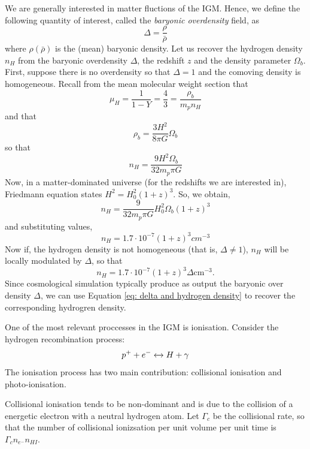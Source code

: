 We are generally interested in matter fluctions of the IGM. Hence, we define the following quantity of interest, called the \emph{baryonic overdensity} field, as 
\begin{equation}
    \Delta =\frac{\rho}{\bar{\rho}}
\end{equation}
where $\rho(\bar{\rho})$ is the (mean) baryonic density. Let us recover the hydrogen density $n_H$ from the baryonic overdensity $\Delta$, the redshift $z$ and the density parameter $\Omega_b$.
First, suppose there is no overdensity so that $\Delta=1$ and the comoving density is homogeneous. Recall from the mean molecular weight section that
\begin{equation}
    \mu_H=\frac{1}{1-Y}=\frac{4}{3}=\frac{\rho_b}{m_pn_H}
\end{equation}
and that
\begin{equation}
    \rho_b=\frac{3H^2}{8\pi G}\Omega_b
\end{equation}
so that
\begin{equation}
    n_H=\frac{9H^2 \Omega_b}{32m_p\pi G} 
\end{equation}
Now, in a matter-dominated universe (for the redshifts we are interested in), Friedmann equation states $H^2=H_0^2(1+z)^3$.
So, we obtain,
\begin{equation}
    n_H=\frac{9}{32m_p\pi G}H_0^2\Omega_b (1+z)^3
\end{equation}
and substituting values,
\begin{equation}
    n_H=1.7\cdot 10^{-7}(1+z)^3 cm^{-3}
\end{equation}
Now if, the hydrogen density is not homogeneous (that is, $\Delta \neq 1$), $n_H$ will be locally modulated by $\Delta$, so that
\begin{equation}\label{eq: delta and hydrogen density}
    n_H=1.7\cdot 10^{-7}(1+z)^3 \Delta \mathrm{cm}^{-3} .
\end{equation}
Since cosmological simulation typically produce as output the baryonic over density $\Delta$, we can use Equation \ref{eq: delta and hydrogen density} to recover the corresponding hydrogren density.





One of the most relevant proccesses in the IGM is ionisation. Consider the hydrogen recombination process:
$$p^+ + e^- \xleftrightarrow \ H +\gamma$$
The ionisation process has two main contribution: collisional ionisation and photo-ionisation.

Collisional ionisation tends to be non-dominant and is due to the collision of a energetic electron with a neutral hydrogen atom. Let $\Gamma_c$ be the collisional rate, so that the number of collisional ionizsation per unit volume per unit time is $\Gamma_c n_{e^-}n_{HI}$.

